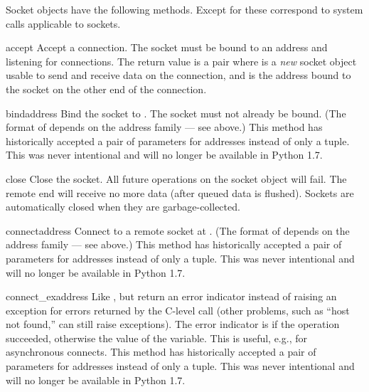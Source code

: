 Socket objects have the following methods.  Except for
 these correspond to \UNIX{} system calls
applicable to sockets.

\begin{methoddesc}[socket]{accept}{}
Accept a connection.
The socket must be bound to an address and listening for connections.
The return value is a pair 
where  is a \emph{new} socket object usable to send and
receive data on the connection, and  is the address bound
to the socket on the other end of the connection.
\end{methoddesc}

\begin{methoddesc}[socket]{bind}{address}
Bind the socket to .  The socket must not already be bound.
(The format of  depends on the address family --- see
above.)    This method has historically accepted a pair
of parameters for  addresses instead of only a
tuple.  This was never intentional and will no longer be available in
Python 1.7.
\end{methoddesc}

\begin{methoddesc}[socket]{close}{}
Close the socket.  All future operations on the socket object will fail.
The remote end will receive no more data (after queued data is flushed).
Sockets are automatically closed when they are garbage-collected.
\end{methoddesc}

\begin{methoddesc}[socket]{connect}{address}
Connect to a remote socket at .
(The format of  depends on the address family --- see
above.)    This method has historically accepted a pair
of parameters for  addresses instead of only a
tuple.  This was never intentional and will no longer be available in
Python 1.7.
\end{methoddesc}

\begin{methoddesc}[socket]{connect_ex}{address}
Like , but return an error indicator
instead of raising an exception for errors returned by the C-level
 call (other problems, such as ``host not found,''
can still raise exceptions).  The error indicator is  if the
operation succeeded, otherwise the value of the 
variable.  This is useful, e.g., for asynchronous connects.
  This method has historically accepted a pair of
parameters for  addresses instead of only a tuple.
This was never intentional and will no longer be available in Python
1.7.
\end{methoddesc}

